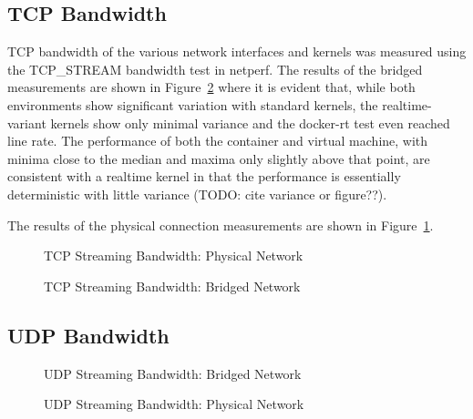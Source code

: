 \subsection{TCP Bandwidth} %
\label{sub:tcpbandwidth}
TCP bandwidth of the various network interfaces and kernels was measured using the TCP\_STREAM bandwidth test in netperf.
The results of the bridged measurements are shown in Figure~\ref{fig:tcp_stream_bridge} where it is evident that, while both environments show significant variation with standard kernels, the realtime-variant kernels show only minimal variance and the docker-rt test even reached line rate.
The performance of both the container and virtual machine, with minima close to the median and maxima only slightly above that point, are consistent with a realtime kernel in that the performance is essentially deterministic with little variance (TODO: cite variance or figure??).

The results of the physical connection measurements are shown in Figure~\ref{fig:tcp_stream_phys}.
\begin{figure}
    \centering
    \def\svgwidth{\columnwidth}
    
    \caption{TCP Streaming Bandwidth: Physical Network}
    \label{fig:tcp_stream_phys}
\end{figure}
\begin{figure}
    \centering
    \def\svgwidth{\columnwidth}
    
    \caption{TCP Streaming Bandwidth: Bridged Network}
    \label{fig:tcp_stream_bridge}
\end{figure}

\subsection{UDP Bandwidth} %
\label{sub:udpbandwidth}
\begin{figure}
    \centering
    \def\svgwidth{\columnwidth}
    
    \caption{UDP Streaming Bandwidth: Bridged Network}
    \label{fig:udp_stream_bridge}
\end{figure}
\begin{figure}
    \centering
    \def\svgwidth{\columnwidth}
    
    \caption{UDP Streaming Bandwidth: Physical Network}
    \label{fig:udp_stream_phys}
\end{figure}



